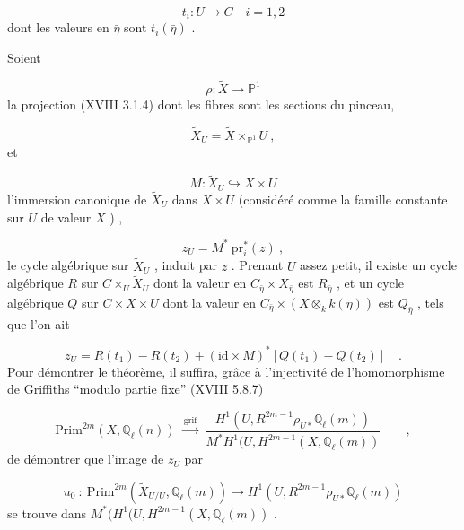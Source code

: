 \begin{equation*}
t_i : U \longrightarrow C \quad i = 1, 2
\end{equation*}
dont les valeurs en $\bar\eta$ sont $t_i(\bar\eta)$ .

Soient

\begin{equation*}
\rho : \widetilde{X} \longrightarrow \mathbb{P}^1
\end{equation*}
la projection (XVIII 3.1.4) dont les fibres sont les sections du pinceau,

\begin{equation*}
\widetilde{X}_U = \widetilde{X} \times_{\mathbb{P}^1} U \ ,
\end{equation*}
et

\begin{equation*}
M : \widetilde{X}_U \hookrightarrow X \times U
\end{equation*}
l'immersion canonique de $\widetilde{X}_U$ dans $X \times U$ (considéré comme la famille constante sur $U$ de valeur $X$ ) ,

\begin{equation*}
z_U = M^* \ \mathrm{pr}_i^*(z) \ ,
\end{equation*}
le cycle algébrique sur $\widetilde{X}_U$ , induit par $z$ . Prenant $U$ assez petit, il existe un cycle algébrique $R$ sur $C \times_U \widetilde{X}_U$ dont la valeur en $C_{\bar\eta} \times X_{\bar\eta}$ est $R_{\bar\eta}$ , et un cycle algébrique $Q$ sur $C \times X \times U$ dont la valeur en $C_{\bar\eta} \times (X \otimes_k k(\bar\eta))$ est $Q_{\bar\eta}$ , tels que l'on ait

\begin{equation}\tag{4.4.13}
z_U = R(t_1) - R(t_2) + (\mathrm{id}\times M)^*[Q(t_1) - Q(t_2)] \quad .
\end{equation}
Pour démontrer le théorème, il suffira, grâce à l'injectivité de
l'homomorphisme de Griffiths  ``modulo partie fixe'' (XVIII 5.8.7)

\begin{equation*}
\mathrm{Prim}^{2m}(X,\mathbb{Q}_\ell(n)) \ \xrightarrow{\ \mathrm{grif}\ }\ \frac{H^1(U,R^{2m-1}\rho_{U*}\mathbb{Q}_\ell(m))}{M^*H^1(U,H^{2m-1}(X,\mathbb{Q}_\ell(m))} \qquad ,
\end{equation*}
de démontrer que l'image de  $z_U$  par

\begin{equation*}
u_0 \ : \ \mathrm{Prim}^{2m}(\widetilde{X}_{U/U},\mathbb{Q}_\ell(m)) \longrightarrow H^1(U,R^{2m-1}\rho_{U*}\mathbb{Q}_\ell(m))
\end{equation*}
se trouve dans  $M^*(H^1(U,H^{2m-1}(X,\mathbb{Q}_\ell(m))$  .

